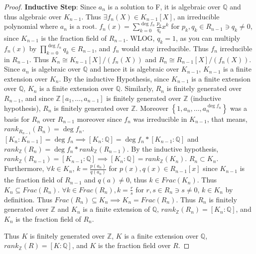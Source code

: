 \documentclass{article}
\newcommand{\Q}{\mathbb{Q}}
\newcommand{\Z}{\mathbb{Z}}
\begin{document}
\begin{proof}
    \textbf{Inductive Step}: Since $a_n$ is a solution to F, it is algebraic over $\Q$ and thus algebraic over $K_{n - 1}$. Thus $\exists f_n(X) \in K_{n - 1}[X]$, an irreducible polynomial where $a_n$ is a root. $f_n(x) = \sum_{k = 0}^{\deg f_n} \frac{p_k}{q_k} x^k$ for $p_k, q_k \in R_{n - 1} \ni q_k \neq 0$, since $K_{n - 1}$ is the fraction field of $R_{n - 1}$. WLOG, $q_k = 1$, as you can multiply $f_n(x)$ by $\prod_{k = 0}^{\deg f_n} q_k \in R_{n - 1}$, and $f_n$ would stay irreducible. 
    Thus $f_n$ irreducible in $R_{n - 1}$. Thus $K_n \cong K_{n - 1}[X] / (f_n(X))$ and $R_{n} \cong R_{n - 1}[X] / (f_n(X))$. Since $a_n$ is algebraic over $\Q$ and hence it is algebraic over $K_{n - 1}$, $K_{n - 1}$ is a finite extension over $K_n$. By the inductive Hypothesis, since $K_{n- 1}$ is a finite extension over $\Q$, $K_{n}$ is a finite extension over $\Q$. Similarly, $R_n$ is finitely generated over $R_{n - 1}$, and since $\Z[a_1, \dots, a_{n - 1}]$ is finitely generated over $\Z$ (inductive hypothesis), $R_n$ is finitely generated over $\Z$. Moreover $\left\{ 1, a_n, \dots, a_n^{\deg f_n} \right\}$ was a basis for $R_n$ over $R_{n - 1}$  moreover since $f_n$ was irreducible in $K_{n- 1}$, that means, $rank_{R_{n - 1}}(R_n) = \deg f_n$. 
    $[K_n : K_{n - 1}] = \deg f_n \implies [K_n : \Q] = \deg f_n * [K_{n - 1} : \Q]$ and $rank_{\Z}(R_n) = \deg f_n * rank_{\Z}(R_{n - 1})$. By the inductive hypothesis, $rank_{\Z}(R_{n - 1}) = [K_{n - 1} : \Q] \implies [K_n : \Q] = rank_{\Z}(K_n)$.
    $R_n \subset K_n$. Furthermore, $\forall k \in K_n$, $k = \frac{p(a_n)}{q(a_n)}$ for $p(x), q(x) \in R_{n - 1}[x]$ since $K_{n - 1}$ is the fraction field of $R_{n - 1}$ and $q(a) \neq 0$, thus $k \in Frac(K_{n})$. Thus $K_n \subseteq Frac(R_n)$. $\forall k \in Frac(R_n), k = \frac{r}{s}$ for $r, s \in R_n \ni s \neq 0$, $k \in K_n$ by definition. Thus $Frac(R_n) \subseteq K_n \implies K_n = Frac(R_n)$. Thus $R_n$ is finitely generated over $\Z$ and $K_n$ is a finite extension of $\Q$, $rank_{\Z}(R_n) = [K_n : \Q]$, and $K_n$ is the fraction field of $R_n$.
    
    Thus $K$ is finitely generated over $\Z$, $K$ is a finite extension over $\Q$, $rank_{\Z}(R) = [K : \Q]$, and $K$ is the fraction field over $R$.     
\end{proof}

\bigskip
\end{document}
